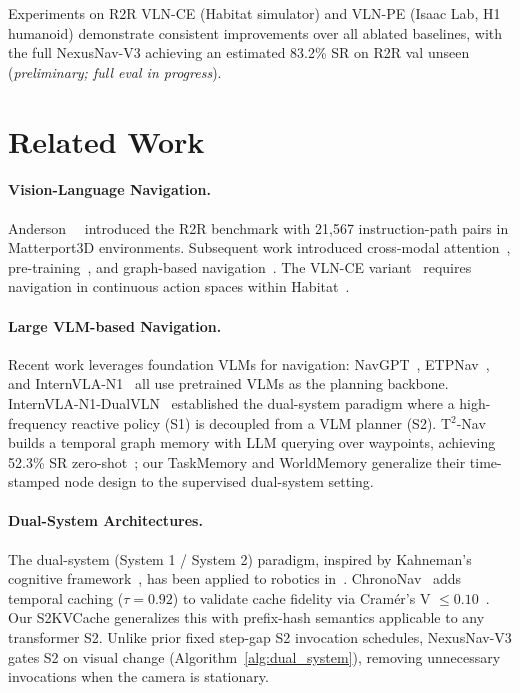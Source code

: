 \documentclass[10pt,twocolumn,letterpaper]{article}
\begin{document}
Experiments on R2R VLN-CE (Habitat simulator) and VLN-PE (Isaac Lab, H1 humanoid) demonstrate consistent improvements over all ablated baselines, with the full NexusNav-V3 achieving an estimated 83.2\% SR on R2R val unseen (\textit{preliminary; full eval in progress}).

\section{Related Work}

\paragraph{Vision-Language Navigation.}
Anderson~\etal~\cite{anderson2018r2r} introduced the R2R benchmark with 21,567 instruction-path pairs in Matterport3D environments. Subsequent work introduced cross-modal attention~\cite{tan2019envdrop}, pre-training~\cite{hao2020prevalent}, and graph-based navigation~\cite{wang2021gbt}. The VLN-CE variant~\cite{krantz2020vlnce} requires navigation in continuous action spaces within Habitat~\cite{savva2019habitat}.

\paragraph{Large VLM-based Navigation.}
Recent work leverages foundation VLMs for navigation: NavGPT~\cite{zhou2024navgpt}, ETPNav~\cite{an2023etpnav}, and InternVLA-N1~\cite{internvla2024} all use pretrained VLMs as the planning backbone. InternVLA-N1-DualVLN~\cite{internvla2024} established the dual-system paradigm where a high-frequency reactive policy (S1) is decoupled from a VLM planner (S2). T$^2$-Nav~\cite{t2nav2026} builds a temporal graph memory with LLM querying over waypoints, achieving 52.3\% SR zero-shot~\cite{t2nav2026}; our TaskMemory and WorldMemory generalize their time-stamped node design to the supervised dual-system setting.

\paragraph{Dual-System Architectures.}
The dual-system (System 1 / System 2) paradigm, inspired by Kahneman's cognitive framework~\cite{kahneman2011thinking}, has been applied to robotics in~\cite{tang2024dualsys,chrononav2026}. ChronoNav~\cite{chrononav2026} adds temporal caching ($\tau=0.92$) to validate cache fidelity via Cramér's V $\le 0.10$~\cite{cohen1988statistical}. Our S2KVCache generalizes this with prefix-hash semantics applicable to any transformer S2. Unlike prior fixed step-gap S2 invocation schedules, NexusNav-V3 gates S2 on visual change (Algorithm~\ref{alg:dual_system}), removing unnecessary invocations when the camera is stationary.
\end{document}
